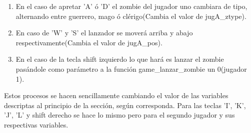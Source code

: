 \documentclass[a4paper]{article}
\begin{document}
\begin{enumerate}
  \item En el caso de apretar 'A' ó 'D' el zombie del jugador uno cambiara de tipo, alternando entre guerrero, mago ó clérigo(Cambia el valor de jugA\_ztype). 
  \item En caso de 'W' y 'S' el lanzador se moverá arriba y abajo respectivamente(Cambia el valor de jugA\_pos).
  \item En el caso de la tecla shift izquierdo lo que hará es lanzar el zombie pasándole como parámetro a la función game\_lanzar\_zombie un 0(jugador 1). 
\end{enumerate}

Estos procesos se hacen sencillamente cambiando el valor de las variables descriptas al principio de la sección, según corresponda. Para las teclas 'I', 'K', 'J', 'L' y shift derecho se hace lo mismo pero para el segundo jugador y sus respectivas variables.
\end{document}
